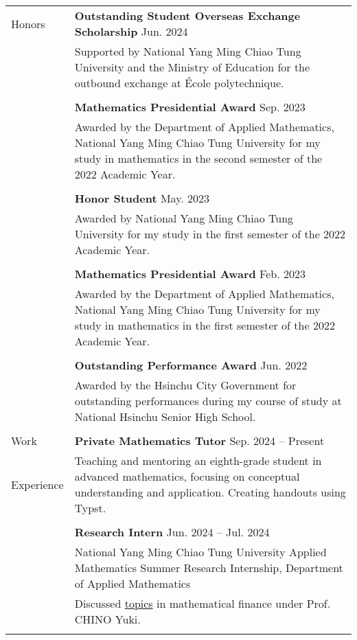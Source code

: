 \documentclass[letterpaper, 11pt]{article}
\begin{document}
\begin{center}
\begin{longtable}{p{0.76in}p{5.93in}}
        {\textcolor{OliveGreen}{Honors}} & \textbf{Outstanding Student Overseas Exchange Scholarship} \hfill Jun. 2024\\
        & Supported by National Yang Ming Chiao Tung University and the Ministry of Education for the outbound exchange at \'Ecole polytechnique. \\
        & \\
        & \textbf{Mathematics Presidential Award} \hfill Sep. 2023\\
        & Awarded by the Department of Applied Mathematics, National Yang Ming Chiao Tung University for my study in mathematics in the second semester of the 2022 Academic Year.\\
        & \\
        & \textbf{Honor Student} \hfill May. 2023\\
        & Awarded by National Yang Ming Chiao Tung University for my study in the first semester of the 2022 Academic Year. \\
        & \\
        & \textbf{Mathematics Presidential Award} \hfill Feb. 2023\\
        & Awarded by the Department of Applied Mathematics, National Yang Ming Chiao Tung University for my study in mathematics in the first semester of the 2022 Academic Year.\\
        & \\
        & \textbf{Outstanding Performance Award} \hfill Jun. 2022\\
        & Awarded by the Hsinchu City Government for outstanding performances during my course of study at National Hsinchu Senior High School.\\
        & \\
        
        
        {\textcolor{OliveGreen}{Work}} & \textbf{Private Mathematics Tutor} \hfill Sep. 2024 -- Present \\
        {\textcolor{OliveGreen}{Experience}} & Teaching and mentoring an eighth-grade student in advanced mathematics, focusing on conceptual understanding and application. Creating handouts using Typst.\\
        & \\

        & \textbf{Research Intern} \hfill Jun. 2024 -- Jul. 2024 \\
        & National Yang Ming Chiao Tung University Applied Mathematics Summer Research Internship, Department of Applied Mathematics\\
        & Discussed \href{https://hackmd.io/@eiken-sc11/B1QcaW3B0}{topics} in mathematical finance under Prof. CHINO Yuki.\\
        & \\


\end{longtable}
\end{center}
\end{document}
